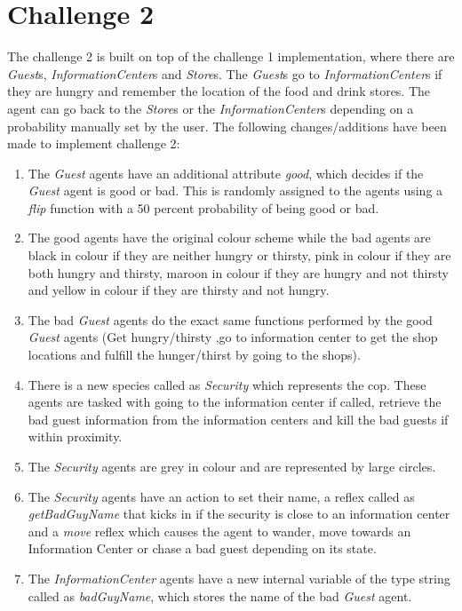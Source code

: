 \documentclass[a4paper]{article}
\begin{document}
\section{Challenge 2}
The challenge 2 is built on top of the challenge 1 implementation, where there are \textit{Guest}s, \textit{InformationCenter}s and \textit{Store}s. The \textit{Guest}s go to \textit{InformationCenter}s if they are hungry and remember the location of the food and drink stores. The agent can go back to the \textit{Store}s or the \textit{InformationCenter}s depending on a probability manually set by the user. The following changes/additions have been made to implement challenge 2:
\begin{enumerate}
    \item The \textit{Guest} agents have an additional attribute \textit{good}, which decides if the \textit{Guest} agent is good or bad. This is randomly assigned to the agents using a \textit{flip} function with a 50 percent probability of being good or bad.
    \item The good agents have the original colour scheme while the bad agents are black in colour if they are neither hungry or thirsty, pink in colour if they are both hungry and thirsty, maroon in colour if they are hungry and not thirsty and yellow in colour if they are thirsty and not hungry.
    \item The bad \textit{Guest} agents do the exact same functions performed by the good \textit{Guest} agents (Get hungry/thirsty ,go to information center to get the shop locations and fulfill the hunger/thirst by going to the shops).
    \item There is a new species called as \textit{Security} which represents the cop. These agents are tasked with going to the information center if called, retrieve the bad guest information from the information centers and kill the bad guests if within proximity.
    \item The \textit{Security} agents are grey in colour and are represented by large circles.
    \item The \textit{Security} agents have an action to set their name, a reflex called as \textit{getBadGuyName} that kicks in if the security is close to an information center and a \textit{move} reflex which causes the agent to wander, move towards an Information Center or chase a bad guest depending on its state.
    \item The \textit{InformationCenter} agents have a new internal variable of the type string called as \textit{badGuyName}, which stores the name of the bad \textit{Guest} agent.

\end{enumerate}
\end{document}
